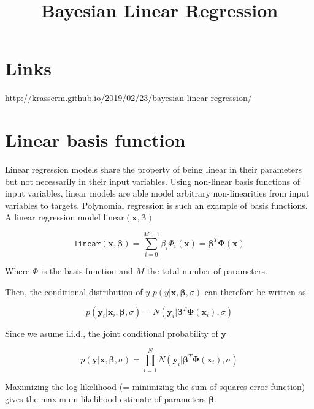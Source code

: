 \documentclass[a4paper,10pt]{article}
\title{Bayesian Linear Regression}
\author{}
\begin{document}
\maketitle

\begin{abstract}

\end{abstract}

\section{Links}

\url{http://krasserm.github.io/2019/02/23/bayesian-linear-regression/}

\section{Linear basis function }

Linear regression models share the property of being linear in their parameters but not necessarily in their input variables. 
Using non-linear basis functions of input variables, linear models are able model arbitrary non-linearities from input variables to targets.  
Polynomial regression is such an example of basis functions.
A linear regression model $\text{linear}(\bm{x},\bm{\beta})$

\begin{equation}
\texttt{linear}(\bm{x},\bm{\beta}) = \sum_{i=0}^{M-1} \beta_i \Phi_i(\bm{x}) = \bm{\beta}^T \bm{\Phi}(\bm{x})
\end{equation}

Where $\Phi$ is the basis function and $M$ the total number of parameters.

Then, the conditional distribution of $y$ $p(y | \bm{x}, \bm{\beta}, \sigma)$ can therefore be written as

\begin{equation}
p(\bm{y}_i | \bm{x}_i, \bm{\beta}, \sigma) = N(\bm{y}_i | \bm{\beta}^T \bm{\Phi}(\bm{x}_i) , \sigma)
\end{equation}

Since we asume i.i.d., the joint conditional probability of $\bm{y}$

\begin{equation}
p(\bm{y} | \bm{x}, \bm{\beta}, \sigma) = \prod_{i=1}^{N} N(\bm{y}_i | \bm{\beta}^T \bm{\Phi}(\bm{x}_i), \sigma)
\end{equation}

Maximizing the log likelihood (= minimizing the sum-of-squares error function) gives the maximum likelihood estimate of parameters $\bm{\beta}$.
\end{document}
